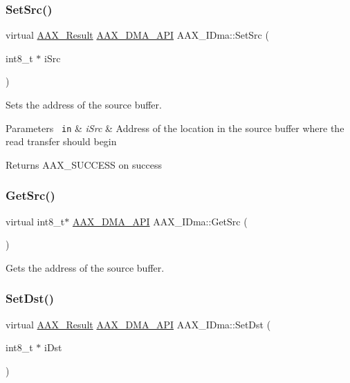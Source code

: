 \subsubsection{\texorpdfstring{SetSrc()}{SetSrc()}}
{\footnotesize\ttfamily virtual \mbox{\hyperlink{a00392_a4d8f69a697df7f70c3a8e9b8ee130d2f}{A\+A\+X\+\_\+\+Result}} \mbox{\hyperlink{a00587_acae60d01e5e4bd3282369d0d9d378f3f}{A\+A\+X\+\_\+\+D\+M\+A\+\_\+\+A\+PI}} A\+A\+X\+\_\+\+I\+Dma\+::\+Set\+Src (\begin{DoxyParamCaption}\item[{int8\+\_\+t $\ast$}]{i\+Src }\end{DoxyParamCaption})\hspace{0.3cm}{\ttfamily [pure virtual]}}



Sets the address of the source buffer. 


\begin{DoxyParams}[1]{Parameters}
\mbox{\texttt{ in}}  & {\em i\+Src} & Address of the location in the source buffer where the read transfer should begin\\
\hline
\end{DoxyParams}
\begin{DoxyReturn}{Returns}
{\ttfamily A\+A\+X\+\_\+\+S\+U\+C\+C\+E\+SS} on success 
\end{DoxyReturn}
\mbox{\label{a01809_af3adfd15058b274b01b86705d42a4cd6}} 
\subsubsection{\texorpdfstring{GetSrc()}{GetSrc()}}
{\footnotesize\ttfamily virtual int8\+\_\+t$\ast$ \mbox{\hyperlink{a00587_acae60d01e5e4bd3282369d0d9d378f3f}{A\+A\+X\+\_\+\+D\+M\+A\+\_\+\+A\+PI}} A\+A\+X\+\_\+\+I\+Dma\+::\+Get\+Src (\begin{DoxyParamCaption}{ }\end{DoxyParamCaption})\hspace{0.3cm}{\ttfamily [pure virtual]}}



Gets the address of the source buffer. 

\mbox{\label{a01809_a80c98a61fc14c8cc87a30360e92655fe}} 
\subsubsection{\texorpdfstring{SetDst()}{SetDst()}}
{\footnotesize\ttfamily virtual \mbox{\hyperlink{a00392_a4d8f69a697df7f70c3a8e9b8ee130d2f}{A\+A\+X\+\_\+\+Result}} \mbox{\hyperlink{a00587_acae60d01e5e4bd3282369d0d9d378f3f}{A\+A\+X\+\_\+\+D\+M\+A\+\_\+\+A\+PI}} A\+A\+X\+\_\+\+I\+Dma\+::\+Set\+Dst (\begin{DoxyParamCaption}\item[{int8\+\_\+t $\ast$}]{i\+Dst }\end{DoxyParamCaption})\hspace{0.3cm}{\ttfamily [pure virtual]}}



